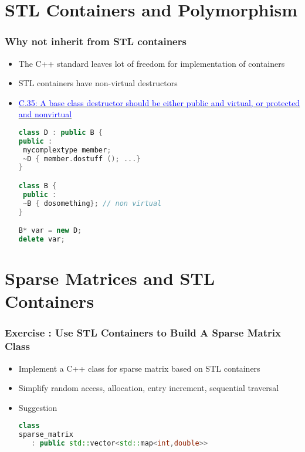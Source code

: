 \documentclass{beamer}
\begin{document}
\section{STL Containers and Polymorphism}
\begin{frame}[fragile]
\frametitle{Why not inherit from STL containers}
\begin{itemize}
\item The C++ standard leaves lot of freedom for implementation of containers
\item STL containers have non-virtual destructors
\item \href{http://isocpp.github.io/CppCoreGuidelines/CppCoreGuidelines\#Rc-dtor-virtual}{\textcolor{blue}{C.35: A base class destructor should be either public and virtual, or protected and nonvirtual}}\\
\small\begin{lstlisting}[language=C++]
class D : public B {
public :
 mycomplextype member;
 ~D { member.dostuff (); ...}
}

class B {
 public :
 ~B { dosomething}; // non virtual
}

B* var = new D;
delete var;
\end{lstlisting}\normalsize
\end{itemize}
\end{frame}



\section{Sparse Matrices and STL Containers}

\begin{frame}[fragile]
\frametitle{Exercise : Use STL Containers to Build A Sparse Matrix Class}
\begin{itemize}
\item Implement a C++ class for sparse matrix based on STL containers
\item Simplify random access, allocation, entry increment, sequential traversal
\item Suggestion \small
\begin{lstlisting}[language=C++]
class 
sparse_matrix 
   : public std::vector<std::map<int,double>>
\end{lstlisting}\normalsize
\end{itemize}
\end{frame}
\end{document}

